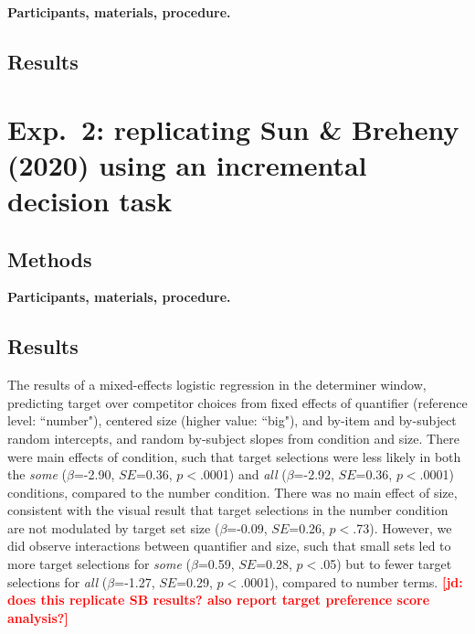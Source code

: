 \documentclass[10pt,letterpaper]{article}
\newcommand{\jd}[1]{\textcolor{Red}{\textbf{[jd: #1]}}}
\begin{document}
\textbf{Participants, materials, procedure.}

\subsection{Results}

\section{Exp.~2: replicating Sun \& Breheny (2020) using an incremental decision task}

\subsection{Methods}

\textbf{Participants, materials, procedure.}

\subsection{Results}

The results of a mixed-effects logistic regression in the determiner window, predicting target over competitor choices from fixed effects of quantifier (reference level: ``number"), centered size (higher value: ``big"), and by-item and by-subject random intercepts, and random by-subject slopes from condition and size. There were main effects of condition, such that target selections were less likely in both the \emph{some} ($\beta$=-2.90, $SE$=0.36, $p<$.0001) and \emph{all} ($\beta$=-2.92, $SE$=0.36, $p<$.0001) conditions, compared to the number condition. There was no main effect of size, consistent with the visual result that target selections in the number condition are not modulated by  target set size ($\beta$=-0.09, $SE$=0.26, $p<$.73). However, we did observe interactions between quantifier and size, such that small sets led to more target selections for \emph{some} ($\beta$=0.59, $SE$=0.28, $p<$.05) but to fewer target selections for \emph{all} ($\beta$=-1.27, $SE$=0.29, $p<$.0001), compared to number terms. \jd{does this replicate SB results? also report target preference score analysis?}

\end{document}
